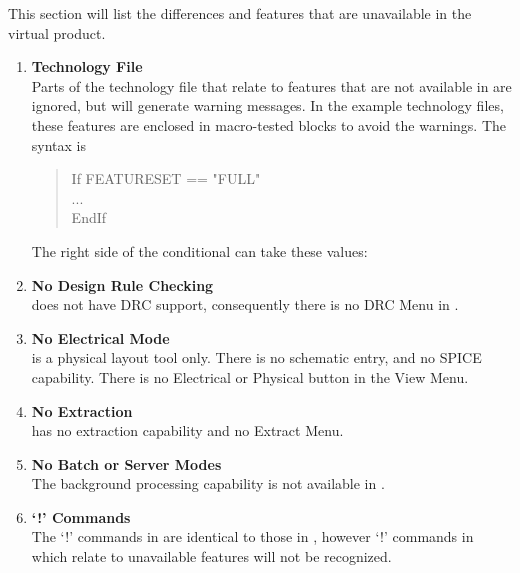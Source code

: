 This section will list the differences and features that are
unavailable in the {\XicII} virtual product.

\begin{enumerate}
\item{\bf Technology File}\\
Parts of the technology file that relate to features that are not
available in {\XicII} are ignored, but will generate warning messages. 
In the example technology files, these features are enclosed in
macro-tested blocks to avoid the warnings.  The syntax is

\begin{quote}\vt
If FEATURESET == "FULL"\\
...\\
EndIf
\end{quote}

The right side of the conditional can take these values:


\item{\bf No Design Rule Checking}\\
{\XicII} does not have DRC support, consequently there is no
{\cb DRC Menu} in {\XicII}.

\item{\bf No Electrical Mode}\\
{\XicII} is a physical layout tool only.  There is no schematic entry,
and no SPICE capability.  There is no {\cb Electrical} or {\cb
Physical} button in the {\cb View Menu}.

\item{\bf No Extraction}\\
{\XicII} has no extraction capability and no {\cb Extract Menu}.

\item{\bf No Batch or Server Modes}\\
The background processing capability is not available in {\XicII}.

\item{\bf `!' Commands}\\
The `!' commands in {\XicII} are identical to those in {\Xic}, however
`!' commands in {\XicII} which relate to unavailable features will not
be recognized.
\end{enumerate}

